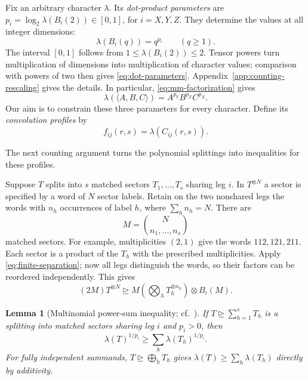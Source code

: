 \documentclass[11pt]{article}
\newtheorem{lemma}[theorem]{Lemma}
\newcommand{\degen}{\unrhd}
\newcommand{\cmm}[3]{\langle #1,#2,#3\rangle}
\begin{document}
Fix an arbitrary character $\lambda$. Its \emph{dot-product parameters}
are $p_i=\log_2\lambda(B_i(2))\in[0,1]$, for $i=X,Y,Z$. They determine
the values at all integer dimensions:
\begin{equation}\label{eq:dot-parameters}
 \lambda(B_i(q))=q^{p_i}\qquad(q\ge1).
\end{equation}
The interval $[0,1]$ follows from $1\le\lambda(B_i(2))\le2$.
Tensor powers turn multiplication of dimensions into multiplication of
character values; comparison with powers of two then gives
\eqref{eq:dot-parameters}. Appendix~\ref{app:counting-rescaling} gives
the details. In particular,
\eqref{eq:mm-factorization} gives
\begin{equation}\label{eq:mm-character}
 \lambda(\cmm{A}{B}{C})=A^{p_Y}B^{p_Z}C^{p_X}.
\end{equation}
Our aim is to constrain these three parameters for every character.
Define its \emph{convolution profiles} by
\begin{equation}\label{eq:discrete-profiles}
 f_{ij}(r,s)=\lambda(C_{ij}(r,s)).
\end{equation}

The next counting argument turns the polynomial splittings into
inequalities for these profiles.

Suppose $T$ splits into $s$ matched sectors $T_1,\ldots,T_s$ sharing
leg $i$. In $T^{\otimes N}$ a sector is specified by a word of $N$
sector labels. Retain on the two nonshared legs the words with $n_h$
occurrences of label $h$, where $\sum_h n_h=N$. There are
\[
 M=\binom{N}{n_1,\ldots,n_s}
\]
matched sectors. For example, multiplicities $(2,1)$ give the words
$112,121,211$. Each sector is a product of the $T_h$ with the prescribed
multiplicities. Apply \eqref{eq:finite-separation}; now all legs
distinguish the words, so their factors can be reordered independently.
This gives
\begin{equation}\label{eq:type-shared}
 (2M)T^{\otimes N}\degen
 M\left(\bigotimes_h T_h^{\otimes n_h}\right)\otimes B_i(M).
\end{equation}

\begin{lemma}[Multinomial power-sum inequality; cf.\ {\cite[Corollary~3.2]{openai-2026-matrix-nine-fourths}}]\label{lem:power-sum}
If $T\degen\sum_{h=1}^s T_h$ is a splitting into matched sectors
sharing leg $i$ and $p_i>0$, then
\begin{equation}\label{eq:power-sum}
 \lambda(T)^{1/p_i}\ge\sum_h\lambda(T_h)^{1/p_i}.
\end{equation}
For fully independent summands, $T\degen\bigoplus_h T_h$ gives
$\lambda(T)\ge\sum_h\lambda(T_h)$ directly by additivity.
\end{lemma}
\end{document}
